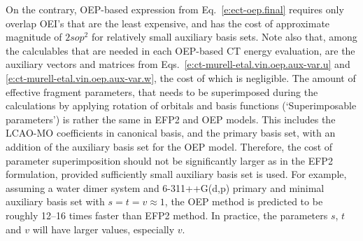 \documentclass[aip,jcp,amsmath,amssymb,reprint,floatfix]{revtex4-1}
\begin{document}
%
\noindent \hspace{-20pt}
On the contrary, 
OEP\hyp{}based expression
from Eq.~\eqref{e:ect-oep.final} requires only overlap OEI's that are the least expensive, 
and has the cost of approximate magnitude of $2sop^2$ for relatively small auxiliary basis sets.
Note also that, among the calculables that are needed in each
OEP\hyp{}based CT energy evaluation, are the auxiliary vectors and matrices 
from Eqs.~\eqref{e:ct-murell-etal.vin.oep.aux-var.u}
and \eqref{e:ct-murell-etal.vin.oep.aux-var.w},
the cost of which is negligible. The amount of effective fragment parameters,
that needs to be superimposed during the calculations by applying rotation
of orbitals and basis functions (`Superimposable parameters')
is rather the same in EFP2 and OEP models. 
This includes the LCAO\hyp{}MO coefficients in canonical basis,
and the primary basis set, with an addition of the auxiliary basis set
for the OEP model. Therefore, the cost of parameter superimposition should
not be significantly larger as in the EFP2 formulation, provided sufficiently 
small auxiliary basis set is used.
For example,
assuming a water dimer system and 6-311++G(d,p) primary and minimal auxiliary basis set
with $s=t=v\approx1$,
the OEP method is predicted to be roughly 12--16 times faster than EFP2 method. In practice,
the parameters $s$, $t$ and $v$ will have larger values, especially $v$.
\end{document}
